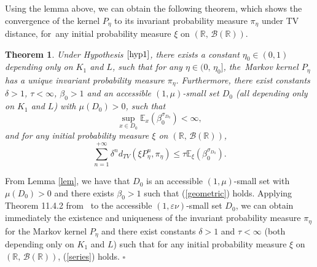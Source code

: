 \documentclass[11pt]{elsarticle}
\newtheorem{theorem}{Theorem}[section]
\def\leq{\leqslant}
\def\E{\mathbb{E}}
\def\R{\mathbb{R}}
\begin{document}
Using the lemma above, we can obtain the following theorem, which shows the convergence of the kernel $P_{\eta}$ to its invariant probability measure $\pi_\eta$ under TV distance, for~any initial probability measure $\xi$ on $(\R,\,\mathcal{B}(\R))$.
\begin{theorem}\label{Thm1}
	Under Hypothesis $\ref{hyp1}$, there exists a constant $\eta_{0}\in(0,1)$ depending only on $K_1$ and $L$, such that for any $\eta\in (0,\,\eta_{0}]$, the~Markov kernel $P_{\eta}$ has a unique invariant probability measure $\pi_{\eta}$. Furthermore, there exist constants $\delta>1$, $\tau<\infty$,  $\beta_{0}>1$ and an accessible $(1,\mu)$-small set  $D_{0}$ (all depending only on $K_1$ and $L$) with $\mu(D_{0})>0$, such that
	\begin{equation}\label{geometric}
		\sup_{x\in D_0}\E_x\left(\beta_{0}^{\sigma_{D_{0}}}\right)<\infty,
	\end{equation}
	and for any initial probability measure $\xi$ on $(\R,\,\mathcal{B}(\R))$,
	\begin{equation}\label{series}
		\sum_{n=1}^{+\infty}\delta^n d_{TV}(\xi P_{\eta}^n,\pi_{\eta})\leq\tau \E_{\xi}\left(\beta_0^{\sigma_{D_0}}\right).
	\end{equation}
\end{theorem}
\begin{pf}
	From Lemma \ref{lem}, we have that $D_0$ is an accessible $(1,\mu)$-small set with $\mu(D_0)>0$ and there exists $\beta_0>1$ such that (\ref{geometric}) holds. Applying {Theorem 11.4.2} from~\cite{DMPS18} to the accessible $(1,\varepsilon\nu)$-small set $D_{0}$, we can obtain immediately the existence and uniqueness of the invariant probability measure $\pi_\eta$ for the Markov kernel $P_{\eta}$ and there exist constants $\delta>1$ and $\tau<\infty$ (both depending only on $K_1$ and $L$) such that for any initial probability measure $\xi$ on $(\R,\,\mathcal{B}(\R))$, (\ref{series}) holds. \hfill$\square$
\end{pf}
\end{document}
